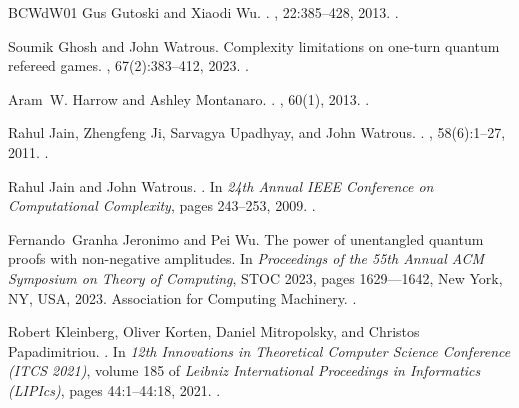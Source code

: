 \documentclass[10pt,a4paper]{article}
\theoremstyle{definition}
\begin{document}
\begin{thebibliography}{BCWdW01}
Gus Gutoski and Xiaodi Wu.
.
, 22:385--428, 2013.
\newblock \href {https://doi.org/10.1007/s00037-013-0065-9}
  {}.

Soumik Ghosh and John Watrous.
\newblock Complexity limitations on one-turn quantum refereed games.
, 67(2):383--412, 2023.
\newblock \href {https://doi.org/10.1007/s00224-022-10105-9}
  {}.

Aram~W. Harrow and Ashley Montanaro.
.
, 60(1), 2013.
\newblock \href {https://doi.org/10.1145/2432622.2432625}
  {}.

Rahul Jain, Zhengfeng Ji, Sarvagya Upadhyay, and John Watrous.
.
, 58(6):1--27, 2011.
\newblock \href {https://doi.org/10.1145/2049697.2049704}
  {}.

Rahul Jain and John Watrous.
.
\newblock In {\em 24th Annual IEEE Conference on Computational Complexity},
  pages 243--253, 2009.
\newblock \href {https://doi.org/10.1109/CCC.2009.26}
  {}.

Fernando~Granha Jeronimo and Pei Wu.
\newblock The power of unentangled quantum proofs with non-negative amplitudes.
\newblock In {\em Proceedings of the 55th Annual ACM Symposium on Theory of
  Computing}, STOC 2023, pages 1629–--1642, New York, NY, USA, 2023.
  Association for Computing Machinery.
\newblock \href {https://doi.org/10.1145/3564246.3585248}
  {}.

Robert Kleinberg, Oliver Korten, Daniel Mitropolsky, and Christos
  Papadimitriou.
.
\newblock In {\em 12th Innovations in Theoretical Computer Science Conference
  (ITCS 2021)}, volume 185 of {\em Leibniz International Proceedings in
  Informatics (LIPIcs)}, pages 44:1--44:18, 2021.
\newblock \href {https://doi.org/10.4230/LIPIcs.ITCS.2021.44}
  {}.


\end{thebibliography}
\end{document}
